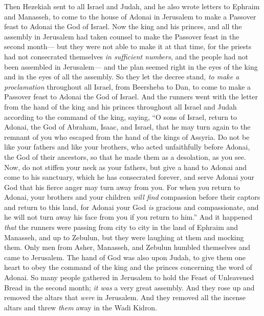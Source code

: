 \begin{biblechapter} %
 Then Hezekiah sent to all Israel and Judah, and he also wrote letters to Ephraim and Manasseh, to come to the house of Adonai in Jerusalem to make a Passover feast to Adonai the God of Israel.
\verse Now the king and his princes, and all the assembly in Jerusalem had taken counsel to make the Passover feast in the second month—
\verse but they were not able to make it at that time, for the priests had not consecrated themselves \textit{in sufficient numbers}, and the people had not been assembled in Jerusalem—
\verse and the plan seemed right in the eyes of the king and in the eyes of all the assembly.
\verse So they let the decree stand, \textit{to make a proclamation} throughout all Israel, from Beersheba to Dan, to come to make a Passover feast to Adonai the God of Israel.
\verse And the runners went with the letter from the hand of the king and his princes throughout all Israel and Judah according to the command of the king, saying, “O sons of Israel, return to Adonai, the God of Abraham, Isaac, and Israel, that he may turn again to the remnant of you who escaped from the hand of the kings of Assyria.
\verse Do not be like your fathers and like your brothers, who acted unfaithfully before Adonai, the God of their ancestors, so that he made them as a desolation, as you see.
\verse Now, do not stiffen your neck as your fathers, but give a hand to Adonai and come to his sanctuary, which he has consecrated forever, and serve Adonai your God that his fierce anger may turn away from you.
\verse For when you return to Adonai, your brothers and your children \textit{will find} compassion before their captors and return to this land, for Adonai your God \textit{is} gracious and compassionate, and he will not turn away his face from you if you return to him.”
\verse And it happened \textit{that} the runners were passing from city to city in the land of Ephraim and Manasseh, and up to Zebulun, but they were laughing at them and mocking them.
\verse Only men from Asher, Manasseh, and Zebulun humbled themselves and came to Jerusalem.
\verse The hand of God was also upon Judah, to give them one heart to obey the command of the king and the princes concerning the word of Adonai.
\verse So many people gathered in Jerusalem to hold the Feast of Unleavened Bread in the second month; \textit{it was} a very great assembly.
\verse And they rose up and removed the altars that \textit{were} in Jerusalem. And they removed all the incense altars and threw \textit{them} away in the Wadi Kidron.

\end{biblechapter}
